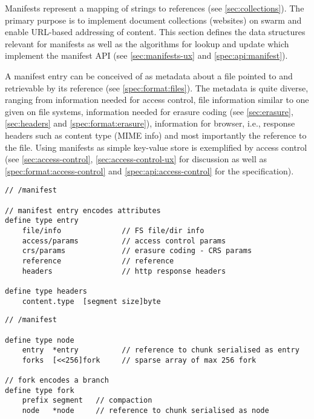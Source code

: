 Manifests represent a mapping of strings to references (see \ref{sec:collections}). The primary purpose is to implement document collections (websites) on swarm and enable URL-based addressing of content. This section defines the data structures relevant for manifests as well as the algorithms for lookup and update which implement the manifest API (see \ref{sec:manifests-ux} and \ref{spec:api:manifest}).

A manifest entry can be conceived of as metadata about a file pointed to and retrievable by its reference (see \ref{spec:format:files}). The metadata is quite diverse, ranging from information needed for access control, file information similar to one given on file systems, information needed for erasure coding (see \ref{sec:erasure}, \ref{sec:headers} and \ref{spec:format:erasure}), information for browser, i.e.,  response headers such as content type (MIME info) and most importantly the reference to the file. Using manifests as simple key-value store is exemplified by access control (see \ref{sec:access-control}, \ref{sec:access-control-ux} for discussion as well as \ref{spec:format:access-control} and \ref{spec:api:access-control} for the specification).

\begin{definition}\label{def:manifest-entry}
\begin{lstlisting}[language=buzz1]
// /manifest

// manifest entry encodes attributes 
define type entry 
    file/info              // FS file/dir info
    access/params          // access control params
    crs/params             // erasure coding - CRS params
    reference              // reference
    headers                // http response headers 

define type headers
    content.type  [segment size]byte

\end{lstlisting}
\end{definition}

\begin{definition}\label{def:manifests}
\begin{lstlisting}[language=buzz1]
// /manifest

define type node 
    entry  *entry          // reference to chunk serialised as entry
    forks  [<<256]fork     // sparse array of max 256 fork

// fork encodes a branch
define type fork 
    prefix segment   // compaction 
    node   *node     // reference to chunk serialised as node

\end{lstlisting}
\end{definition}

